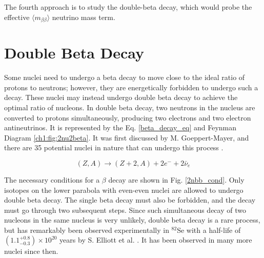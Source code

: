 The fourth approach is to study the double-beta decay, which would probe the effective $\langle m_{\beta\beta}\rangle$ neutrino mass term.

\section{Double Beta Decay}
Some nuclei need to undergo a beta decay to move close to the ideal ratio of protons to neutrons; however, they are energetically forbidden to undergo such a decay. These nuclei may instead undergo double beta decay to achieve the optimal ratio of nucleons. In double beta decay, two neutrons in the nucleus are converted to protons simultaneously, producing two electrons and two electron antineutrinos. It is represented by the Eq. \ref{beta_decay_eq} and Feynman Diagram \ref{ch1:fig:2nu2beta}. It was first discussed by M. Goeppert-Mayer, and there are 35 potential nuclei in nature that can undergo this process \cite{ZUBER_2012}.

\begin{equation}\label{beta_decay_eq}
(Z,A) \rightarrow (Z+2,A) + 2e^- + 2\bar{\nu}_e
\end{equation}



The necessary conditions for a $\beta$ decay are shown in Fig. \ref{2nbb_cond}. Only isotopes on the lower parabola with even-even nuclei are allowed to undergo double beta decay. The single beta decay must also be forbidden, and the decay must go through two subsequent steps. Since such simultaneous decay of two nucleons in the same nucleus is very unlikely, double beta decay is a rare process, but has remarkably been observed experimentally in $^{82}$Se with a half-life of $(1.1^{+0.8}_{-0.3})\times 10^{20}$ years by S. Elliott et al. \cite{PhysRevLett.59.2020}. It has been observed in many more nuclei since then.

